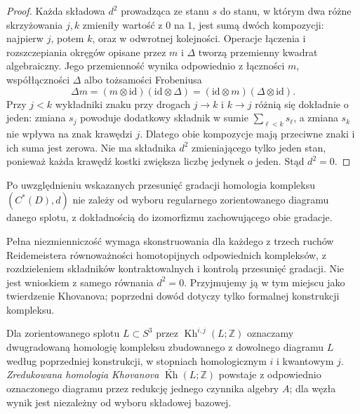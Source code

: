\begin{proof}
Każda składowa $d^2$ prowadząca ze stanu $s$ do stanu,
w którym dwa różne skrzyżowania $j,k$ zmieniły wartość
z $0$ na $1$, jest sumą dwóch kompozycji: najpierw $j$,
potem $k$, oraz w odwrotnej kolejności. Operacje
łączenia i rozszczepiania okręgów opisane przez $m$
i $\Delta$ tworzą przemienny kwadrat algebraiczny.
Jego przemienność wynika odpowiednio z łączności
$m$, współłączności $\Delta$ albo tożsamości Frobeniusa
\[
\Delta m=(m\otimes\mathrm{id})(\mathrm{id}\otimes\Delta)
=(\mathrm{id}\otimes m)(\Delta\otimes\mathrm{id}).
\]
Przy $j<k$ wykładniki znaku przy drogach $j\to k$
i $k\to j$ różnią się dokładnie o jeden: zmiana $s_j$
powoduje dodatkowy składnik w sumie $\sum_{\ell<k}s_\ell$,
a zmiana $s_k$ nie wpływa na znak krawędzi $j$.
Dlatego obie kompozycje mają przeciwne znaki
i ich suma jest zerowa. Nie ma składnika $d^2$
zmieniającego tylko jeden stan, ponieważ każda krawędź
kostki zwiększa liczbę jedynek o jeden. Stąd $d^2=0$.
\end{proof}

\begin{twierdzenie}
Po uwzględnieniu wskazanych przesunięć gradacji
homologia kompleksu $(C^*(D),d)$ nie zależy od wyboru
regularnego zorientowanego diagramu danego splotu,
z dokładnością do izomorfizmu zachowującego obie gradacje.
\end{twierdzenie}

\begin{uwaga}
Pełna niezmienniczość wymaga skonstruowania dla każdego
z trzech ruchów Reidemeistera równoważności homotopijnych
odpowiednich kompleksów, z rozdzieleniem składników
kontraktowalnych i kontrolą przesunięć gradacji.
Nie jest wnioskiem z samego równania $d^2=0$.
Przyjmujemy ją w tym miejscu jako twierdzenie Khovanova;
poprzedni dowód dotyczy tylko formalnej konstrukcji kompleksu.
\end{uwaga}

\begin{definicja}
Dla zorientowanego splotu $L\subset S^3$ przez
$\operatorname{Kh}^{i,j}(L;\mathbb Z)$ oznaczamy dwugradowaną
homologię kompleksu zbudowanego z dowolnego diagramu $L$
według poprzedniej konstrukcji, w stopniach homologicznym $i$
i kwantowym $j$. \emph{Zredukowana homologia Khovanova}
$\widetilde{\operatorname{Kh}}(L;\mathbb Z)$ powstaje
z odpowiednio oznaczonego diagramu przez redukcję
jednego czynnika algebry $A$; dla węzła wynik jest
niezależny od wyboru składowej bazowej.
\end{definicja}

